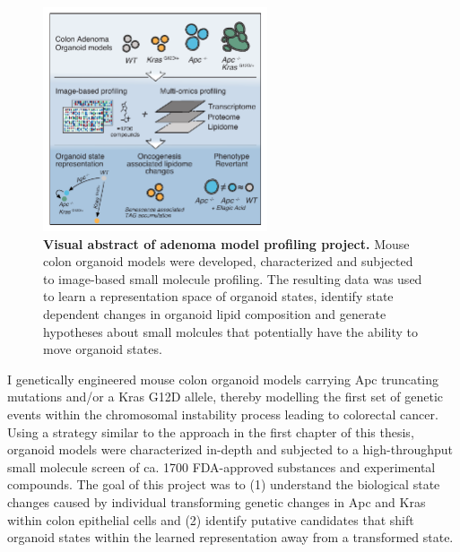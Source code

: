 \begin{flushleft}
\begin{figure}[h]
\centering
\includegraphics[width=250,
                height=\textheight,
                keepaspectratio]{figures/adenomaprofiling/pdf/fig_0_2.pdf}
\caption{\textbf{Visual abstract of adenoma model profiling project.} Mouse colon organoid models were developed, characterized and subjected to image-based small molecule profiling. The resulting data was used to learn a representation space of organoid states, identify state dependent changes in organoid lipid composition and generate hypotheses about small molcules that potentially have the ability to move organoid states.}
\label{fig_a02}
\end{figure}
\bigbreak

I genetically engineered mouse colon organoid models carrying Apc truncating mutations and/or a Kras G12D allele, thereby modelling the first set of genetic events within the chromosomal instability process leading to colorectal cancer. Using a strategy similar to the approach in the first chapter of this thesis, organoid models were characterized in-depth and subjected to a high-throughput small molecule screen of ca. 1700 FDA-approved substances and experimental compounds. The goal of this project was to (1) understand the biological state changes caused by individual transforming genetic changes in Apc and Kras within colon epithelial cells and (2) identify putative candidates that shift organoid states within the learned representation away from a transformed state. 



\end{flushleft}
